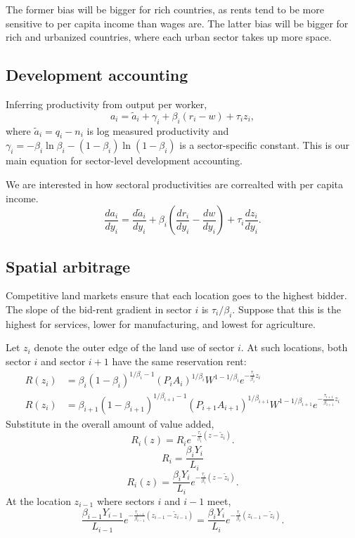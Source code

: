 \documentclass[12pt]{article}
\begin{document}
The former bias will be bigger for rich countries, as rents tend to be more sensitive to per capita income than wages are. The latter bias will be bigger for rich and urbanized countries, where each urban sector takes up more space.

\subsection{Development accounting}

Inferring productivity from output per worker,
\[
a_i =  \tilde a_i +\gamma_i
+\beta_i (r_i-w)
+ \tau_{i}z_{i},
\]
where $\tilde a_i = q_i-n_i$ is log measured productivity and $\gamma_i = -\beta_i\ln\beta_i-(1-\beta_i)\ln(1-\beta_i)$ is a sector-specific constant. This is our main equation for sector-level development accounting.

We are interested in how sectoral productivities are correalted with per capita income.
\[
\frac{d a_i}{dy_i} = \frac{d \tilde a_i}{dy_i} +\beta_i \left(
\frac{d r_i}{dy_i}-\frac{d w}{dy_i}\right)
+ \tau_{i}\frac{d z_i}{dy_i}.
\]


\subsection{Spatial arbitrage}
Competitive land markets ensure that each location goes to the highest bidder. The slope of the bid-rent gradient in sector $i$ is $\tau_i/\beta_i$. Suppose that this is the highest for services, lower for manufacturing, and lowest for agriculture.

Let $z_i$ denote the outer edge of the land use of sector $i$. At such locations, both sector $i$ and sector $i+1$ have the same reservation rent: 
\begin{align*}
R(z_i) &=\beta_i(1-\beta_i)^{1/\beta_i-1} (P_iA_i)^{1/\beta_i} W^{1-1/\beta_i} e^{-\frac{\tau_i}{\beta_i} z_i}\\
R(z_i) &=\beta_{i+1}(1-\beta_{i+1})^{1/\beta_{i+1}-1} (P_{i+1}A_{i+1})^{1/\beta_{i+1}} W^{1-1/\beta_{i+1}} e^{-\frac{\tau_{i+1}}{\beta_{i+1}} z_i}
\end{align*}
Substitute in the overall amount of value added,
\[
R_i(z) = R_i e^{-\frac{\tau_i}{\beta_i}(z-\tilde z_i)}.
\]
\[
R_i = \frac{\beta_i Y_i}{L_i}
\]
\[
R_i(z) = \frac{\beta_i Y_i}{L_i} e^{-\frac{\tau_i}{\beta_i}(z-\tilde z_i)}.
\]
At the location $z_{i-1}$ where sectors $i$ and $i-1$ meet,
\[
\frac{\beta_{i-1} Y_{i-1}}{L_{i-1}} 
  e^{-\frac{\tau_{i-1}}{\beta_{i-1}}(z_{i-1}-\tilde z_{i-1})} = 
\frac{\beta_i Y_i}{L_i} 
  e^{-\frac{\tau_i}{\beta_i}(z_{i-1} -\tilde z_i)}.
\]
\end{document}
